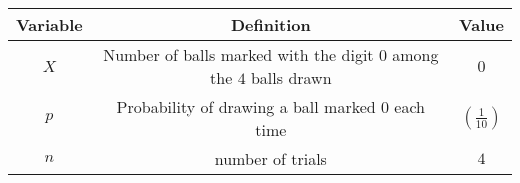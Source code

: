 \begin{tabular}{|c|c|c|}
\hline
Variable & Definition & Value\\
\hline
$X$ & Number of balls marked with the digit $0$ among the $4$ balls drawn & $0$\\
\hline
$p$ & Probability of drawing a ball marked $0$ each time & $(\frac{1}{10})$ \\
\hline
$n$ & number of trials & $4$ \\
\hline
\end{tabular}\\
